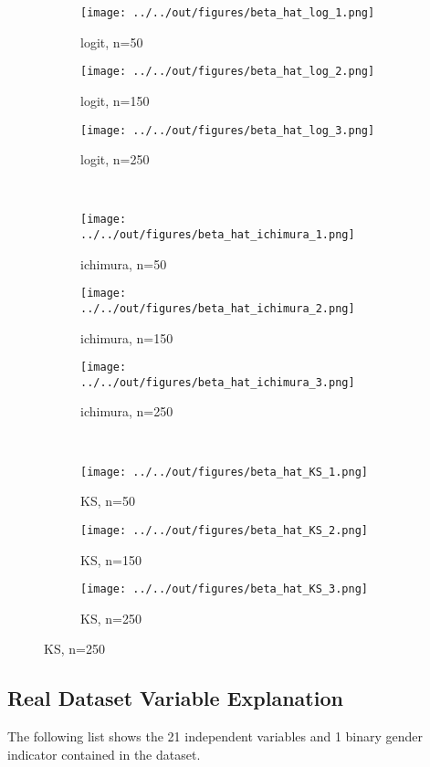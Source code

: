 \begin{figure}
\caption{Consistency study: comparison between different sample sizes}
\centering
\begin{subfigure}{.3\textwidth}
  \centering
  \texttt{[image: ../../out/figures/beta\_hat\_log\_1.png]}
  \caption{logit, n=50}
\end{subfigure}%
\begin{subfigure}{.3\textwidth}
  \centering
  \texttt{[image: ../../out/figures/beta\_hat\_log\_2.png]}
  \caption{logit, n=150}
\end{subfigure}%
\begin{subfigure}{.3\textwidth}
  \centering
  \texttt{[image: ../../out/figures/beta\_hat\_log\_3.png]}
  \caption{logit, n=250}
\end{subfigure}%
\\
\begin{subfigure}{.3\textwidth}
  \centering
  \texttt{[image: ../../out/figures/beta\_hat\_ichimura\_1.png]}
  \caption{ichimura, n=50}
\end{subfigure}%
\begin{subfigure}{.3\textwidth}
  \centering
  \texttt{[image: ../../out/figures/beta\_hat\_ichimura\_2.png]}
  \caption{ichimura, n=150}
\end{subfigure}%
\begin{subfigure}{.3\textwidth}
  \centering
  \texttt{[image: ../../out/figures/beta\_hat\_ichimura\_3.png]}
  \caption{ichimura, n=250}
\end{subfigure}%
\\
\begin{subfigure}{.3\textwidth}
  \centering
  \texttt{[image: ../../out/figures/beta\_hat\_KS\_1.png]}
  \caption{KS, n=50}
\end{subfigure}%
\begin{subfigure}{.3\textwidth}
  \centering
  \texttt{[image: ../../out/figures/beta\_hat\_KS\_2.png]}
  \caption{KS, n=150}
\end{subfigure}%
\begin{subfigure}{.3\textwidth}
  \centering
  \texttt{[image: ../../out/figures/beta\_hat\_KS\_3.png]}
  \caption{KS, n=250}
\end{subfigure}%
\end{figure}

\newpage
\subsection{Real Dataset Variable Explanation}
The following list shows the 21 independent variables and 1 binary gender indicator contained in the dataset.

